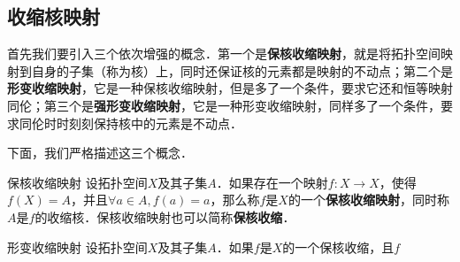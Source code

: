 \subsection{收缩核映射}

首先我们要引入三个依次增强的概念．第一个是\textbf{保核收缩映射}，就是将拓扑空间映射到自身的子集（称为核）上，同时还保证核的元素都是映射的不动点；第二个是\textbf{形变收缩映射}，它是一种保核收缩映射，但是多了一个条件，要求它还和恒等映射同伦；第三个是\textbf{强形变收缩映射}，它是一种形变收缩映射，同样多了一个条件，要求同伦时时刻刻保持核中的元素是不动点．

下面，我们严格描述这三个概念．

\begin{definition}{保核收缩映射}
设拓扑空间$X$及其子集$A$．如果存在一个映射$f:X\rightarrow X$，使得$f(X)=A$，并且$\forall a\in A, f(a)=a$，那么称$f$是$X$的一个\textbf{保核收缩映射}，同时称$A$是$f$的收缩核．保核收缩映射也可以简称\textbf{保核收缩}．
\end{definition}

\begin{definition}{形变收缩映射}
设拓扑空间$X$及其子集$A$．如果$f$是$X$的一个保核收缩，且$f$
\end{definition}
